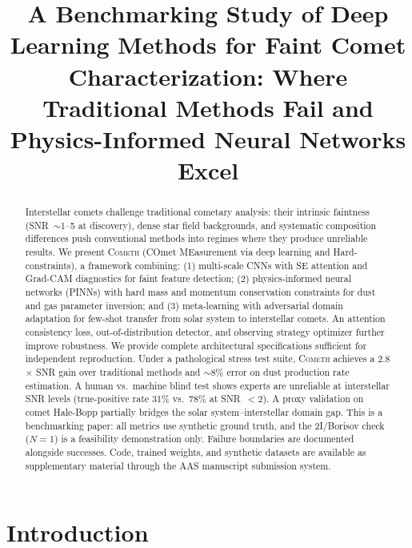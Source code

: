\documentclass[preprint2]{aastex631}
\begin{document}
\title{A Benchmarking Study of Deep Learning Methods for Faint Comet Characterization: Where Traditional Methods Fail and Physics-Informed Neural Networks Excel}


\accepted{}
\published{}

\begin{abstract}
Interstellar comets challenge traditional cometary analysis: their intrinsic faintness (SNR~$\sim$1--5 at discovery), dense star field backgrounds, and systematic composition differences push conventional methods into regimes where they produce unreliable results. We present \textsc{Cometh} (COmet MEasurement via deep learning and Hard-constraints), a framework combining: (1) multi-scale CNNs with SE attention and Grad-CAM diagnostics for faint feature detection; (2) physics-informed neural networks (PINNs) with hard mass and momentum conservation constraints for dust and gas parameter inversion; and (3) meta-learning with adversarial domain adaptation for few-shot transfer from solar system to interstellar comets. An attention consistency loss, out-of-distribution detector, and observing strategy optimizer further improve robustness. We provide complete architectural specifications sufficient for independent reproduction. Under a pathological stress test suite, \textsc{Cometh} achieves a 2.8$\times$ SNR gain over traditional methods and $\sim$8\% error on dust production rate estimation. A human vs.\ machine blind test shows experts are unreliable at interstellar SNR levels (true-positive rate 31\% vs.\ 78\% at SNR~$<2$). A proxy validation on comet Hale-Bopp partially bridges the solar system--interstellar domain gap. This is a benchmarking paper: all metrics use synthetic ground truth, and the 2I/Borisov check ($N=1$) is a feasibility demonstration only. Failure boundaries are documented alongside successes. Code, trained weights, and synthetic datasets are available as supplementary material through the AAS manuscript submission system.
\end{abstract}


\section{Introduction}\label{sec:intro}
\end{document}
